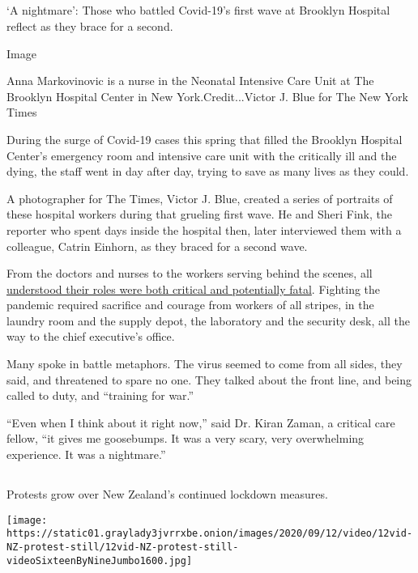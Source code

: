\hypertarget{-3}{%
\subsection{}\label{-3}}

`A nightmare': Those who battled Covid-19's first wave at Brooklyn
Hospital reflect as they brace for a second.

Image

Anna Markovinovic is a nurse in the Neonatal Intensive Care Unit at The
Brooklyn Hospital Center in New York.Credit...Victor J. Blue for The New
York Times

During the surge of Covid-19 cases this spring that filled the Brooklyn
Hospital Center's emergency room and intensive care unit with the
critically ill and the dying, the staff went in day after day, trying to
save as many lives as they could.

A photographer for The Times, Victor J. Blue, created a series of
portraits of these hospital workers during that grueling first wave. He
and Sheri Fink, the reporter who spent days inside the hospital then,
later interviewed them with a colleague, Catrin Einhorn, as they braced
for a second wave.

From the doctors and nurses to the workers serving behind the scenes,
all
\href{https://www.nytimes3xbfgragh.onion/2020/09/11/nyregion/coronavirus-brooklyn-hospital-workers.html}{understood
their roles were both critical and potentially fatal}. Fighting the
pandemic required sacrifice and courage from workers of all stripes, in
the laundry room and the supply depot, the laboratory and the security
desk, all the way to the chief executive's office.

Many spoke in battle metaphors. The virus seemed to come from all sides,
they said, and threatened to spare no one. They talked about the front
line, and being called to duty, and ``training for war.''

``Even when I think about it right now,'' said Dr. Kiran Zaman, a
critical care fellow, ``it gives me goosebumps. It was a very scary,
very overwhelming experience. It was a nightmare.''

\hypertarget{-4}{%
\subsection{}\label{-4}}

Protests grow over New Zealand's continued lockdown measures.

\texttt{[image: https://static01.graylady3jvrrxbe.onion/images/2020/09/12/video/12vid-NZ-protest-still/12vid-NZ-protest-still-videoSixteenByNineJumbo1600.jpg]}


